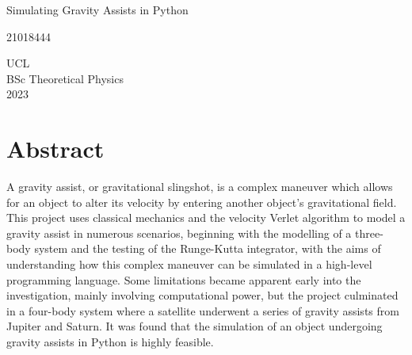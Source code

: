 \documentclass[12pt, english]{report}
\begin{document}
\begin{titlepage}

   \begin{center}
       \vspace*{3cm}
       {Simulating Gravity Assists in Python}
 
       \vspace{4cm}
 
       {21018444}\\
       
       \vspace*{10cm}
      
       
      UCL\\
      
      BSc Theoretical Physics\\
      
      2023
      
 
   \end{center}
\end{titlepage}

\setcounter{page}{2}
\noindent 
\chapter*{\huge{\textbf{Abstract}}}
\normalsize{\noindent A gravity assist, or gravitational slingshot, is a complex maneuver which allows for an object to alter its velocity by entering another object's gravitational field. This project uses classical mechanics and the velocity Verlet algorithm to model a gravity assist in numerous scenarios, beginning with the modelling of a three-body system and the testing of the Runge-Kutta integrator, with the aims of understanding how this complex maneuver can be simulated in a high-level programming language. Some limitations became apparent early into the investigation, mainly involving computational power, but the project culminated in a four-body system where a satellite underwent a series of gravity assists from Jupiter and Saturn. It was found that the simulation of an object undergoing gravity assists in Python is highly feasible.}
%


%


\setlength{\cftbeforetoctitleskip}{-22pt}
\setlength{\cftaftertoctitleskip}{-22pt}
\renewcommand{\contentsname}{\huge\textbf{Table of Contents}}
\renewcommand{\cfttoctitlefont}{\chapter*}
\end{document}

